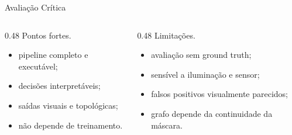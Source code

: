 \documentclass[aspectratio=169,11pt]{beamer}
\begin{document}
\begin{frame}{Avaliação Crítica}
    \begin{columns}[T,totalwidth=\textwidth]
        \begin{column}{0.48\textwidth}
            \Large Pontos fortes.
            \vspace{0.3cm}

            \begin{itemize}
                \item pipeline completo e executável;
                \item decisões interpretáveis;
                \item saídas visuais e topológicas;
                \item não depende de treinamento.
            \end{itemize}
        \end{column}
        \begin{column}{0.48\textwidth}
            \Large Limitações.
            \vspace{0.3cm}

            \begin{itemize}
                \item avaliação sem ground truth;
                \item sensível a iluminação e sensor;
                \item falsos positivos visualmente parecidos;
                \item grafo depende da continuidade da máscara.
            \end{itemize}
        \end{column}
    \end{columns}
\end{frame}
\end{document}
